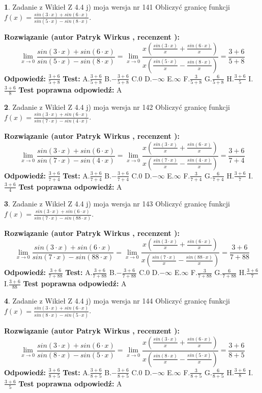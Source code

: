\documentclass[12pt, a4paper]{article}
\theoremstyle{definition} %
\newtheorem{zad}{}
\newcommand{\zadStart}[1]{\begin{zad}#1\newline}
\newcommand{\zadStop}{\end{zad}}
\newcommand{\rozwStart}[2]{\noindent \textbf{Rozwiązanie (autor #1 , recenzent #2): }\newline}
\newcommand{\rozwStop}{\newline}
\newcommand{\odpStart}{\noindent \textbf{Odpowiedź:}\newline}
\newcommand{\odpStop}{\newline}
\newcommand{\testStart}{\noindent \textbf{Test:}\newline}
\newcommand{\testStop}{\newline}
\newcommand{\kluczStart}{\noindent \textbf{Test poprawna odpowiedź:}\newline}
\newcommand{\kluczStop}{\newline}
\begin{document}
\zadStart{Zadanie z Wikieł Z 4.4 j) moja wersja nr 141}
Obliczyć granicę funkcji $f(x)=\frac{sin(3\cdot x) +sin(6\cdot x)}{sin(5\cdot x) -sin(8\cdot x)}$.
\zadStop
\rozwStart{Patryk Wirkus}{}
$$\lim\limits_{x\to 0}\frac{sin(3\cdot x) +sin(6\cdot x)}{sin(5\cdot x) -sin(8\cdot x)}=\lim\limits_{x\to 0}\frac{x(\frac{sin(3\cdot x)}{x}+\frac{sin(6\cdot x)}{x})}{x(\frac{sin(5\cdot x)}{x}-\frac{sin(8\cdot x)}{x})}=\frac{3+6}{5+8}$$
\rozwStop
\odpStart
$\frac{3+6}{5+8}$
\odpStop
\testStart
A.$\frac{3+6}{5+8}$
B.$-\frac{3+6}{5+8}$
C.$0$
D.$-\infty$
E.$\infty$
F.$\frac{3}{5+8}$
G.$\frac{6}{5+8}$
H.$\frac{3+6}{5}$
I.$\frac{3+6}{8}$
\testStop
\kluczStart
A
\kluczStop



\zadStart{Zadanie z Wikieł Z 4.4 j) moja wersja nr 142}
Obliczyć granicę funkcji $f(x)=\frac{sin(3\cdot x) +sin(6\cdot x)}{sin(7\cdot x) -sin(4\cdot x)}$.
\zadStop
\rozwStart{Patryk Wirkus}{}
$$\lim\limits_{x\to 0}\frac{sin(3\cdot x) +sin(6\cdot x)}{sin(7\cdot x) -sin(4\cdot x)}=\lim\limits_{x\to 0}\frac{x(\frac{sin(3\cdot x)}{x}+\frac{sin(6\cdot x)}{x})}{x(\frac{sin(7\cdot x)}{x}-\frac{sin(4\cdot x)}{x})}=\frac{3+6}{7+4}$$
\rozwStop
\odpStart
$\frac{3+6}{7+4}$
\odpStop
\testStart
A.$\frac{3+6}{7+4}$
B.$-\frac{3+6}{7+4}$
C.$0$
D.$-\infty$
E.$\infty$
F.$\frac{3}{7+4}$
G.$\frac{6}{7+4}$
H.$\frac{3+6}{7}$
I.$\frac{3+6}{4}$
\testStop
\kluczStart
A
\kluczStop



\zadStart{Zadanie z Wikieł Z 4.4 j) moja wersja nr 143}
Obliczyć granicę funkcji $f(x)=\frac{sin(3\cdot x) +sin(6\cdot x)}{sin(7\cdot x) -sin(88\cdot x)}$.
\zadStop
\rozwStart{Patryk Wirkus}{}
$$\lim\limits_{x\to 0}\frac{sin(3\cdot x) +sin(6\cdot x)}{sin(7\cdot x) -sin(88\cdot x)}=\lim\limits_{x\to 0}\frac{x(\frac{sin(3\cdot x)}{x}+\frac{sin(6\cdot x)}{x})}{x(\frac{sin(7\cdot x)}{x}-\frac{sin(88\cdot x)}{x})}=\frac{3+6}{7+88}$$
\rozwStop
\odpStart
$\frac{3+6}{7+88}$
\odpStop
\testStart
A.$\frac{3+6}{7+88}$
B.$-\frac{3+6}{7+88}$
C.$0$
D.$-\infty$
E.$\infty$
F.$\frac{3}{7+88}$
G.$\frac{6}{7+88}$
H.$\frac{3+6}{7}$
I.$\frac{3+6}{88}$
\testStop
\kluczStart
A
\kluczStop



\zadStart{Zadanie z Wikieł Z 4.4 j) moja wersja nr 144}
Obliczyć granicę funkcji $f(x)=\frac{sin(3\cdot x) +sin(6\cdot x)}{sin(8\cdot x) -sin(5\cdot x)}$.
\zadStop
\rozwStart{Patryk Wirkus}{}
$$\lim\limits_{x\to 0}\frac{sin(3\cdot x) +sin(6\cdot x)}{sin(8\cdot x) -sin(5\cdot x)}=\lim\limits_{x\to 0}\frac{x(\frac{sin(3\cdot x)}{x}+\frac{sin(6\cdot x)}{x})}{x(\frac{sin(8\cdot x)}{x}-\frac{sin(5\cdot x)}{x})}=\frac{3+6}{8+5}$$
\rozwStop
\odpStart
$\frac{3+6}{8+5}$
\odpStop
\testStart
A.$\frac{3+6}{8+5}$
B.$-\frac{3+6}{8+5}$
C.$0$
D.$-\infty$
E.$\infty$
F.$\frac{3}{8+5}$
G.$\frac{6}{8+5}$
H.$\frac{3+6}{8}$
I.$\frac{3+6}{5}$
\testStop
\kluczStart
A
\kluczStop
\end{document}

